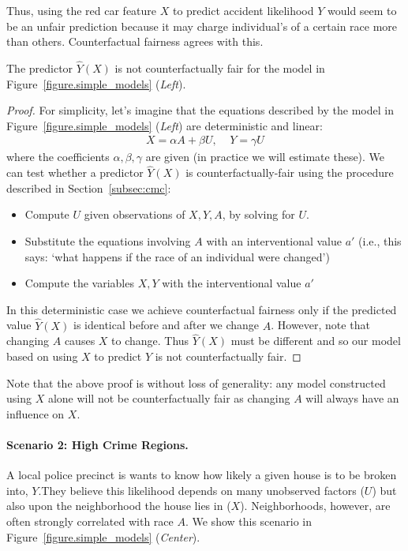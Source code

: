 Thus, using the red car feature $X$ to predict accident likelihood $Y$ would seem to be an unfair prediction because it may charge individual's of a certain race more than others. Counterfactual fairness agrees with this. 

\begin{lem}
The predictor $\hat{Y}(X)$ is not counterfactually fair for the model in Figure~\ref{figure.simple_models} (\emph{Left}).
\end{lem}

\begin{proof}
For simplicity, let's imagine that the equations described by the model in Figure~\ref{figure.simple_models} (\emph{Left}) are deterministic and linear:
\begin{align}
X = \alpha A + \beta U, \;\;\;\; Y = \gamma U \nonumber
\end{align}
where the coefficients $\alpha,\beta,\gamma$ are given (in practice we will estimate these). We can test whether a predictor $\hat{Y}(X)$ is counterfactually-fair using the procedure described in Section~\ref{subsec:cmc}:
\begin{itemize}
\item Compute $U$ given observations of $X,Y,A$, by solving for $U$.
\item Substitute the equations involving $A$ with an interventional value $a'$ (i.e., this says: `what happens if the race of an individual were changed')
\item Compute the variables $X,Y$ with the interventional value $a'$
\end{itemize}
In this deterministic case we achieve counterfactual fairness only if the predicted value $\hat{Y}(X)$ is identical before and after we change $A$. However, note that changing $A$ causes $X$ to change. Thus $\hat{Y}(X)$ must be different and so our model based on using $X$ to predict $Y$ is not counterfactually fair.
\end{proof}
Note that the above proof is without loss of generality: any model constructed using $X$ alone will not be counterfactually fair as changing $A$ will always have an influence on $X$.


\paragraph{Scenario 2: High Crime Regions.} 
A local police precinct is wants to know how likely a given house is to be broken into, $Y$.They believe this likelihood depends on many unobserved factors
($U$) but also upon the neighborhood the house lies in ($X$). Neighborhoods, however, are often strongly correlated with
race $A$. We show this scenario in Figure~\ref{figure.simple_models} (\emph{Center}).


